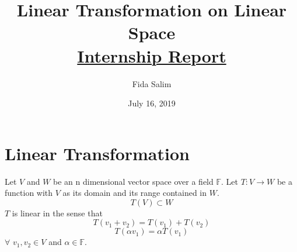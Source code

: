 \documentclass[12pt]{article}
\theoremstyle{definition}
\begin{document}
	\title{\textbf{Linear Transformation on Linear Space} \\
		\large\underline{Internship Report} 
	}
	\author{Fida Salim}
	\date{July 16, 2019}
	\maketitle
	\section{Linear Transformation}
	Let $ V $ and $W $ be an n dimensional vector space over a field $ \mathbb{F} $. Let $ T :V\rightarrow W $ be a function with $ V $ as its domain and its range contained in $ W $. $$ T(V)\subset W $$$ T $ is linear in the sense that $$ T(v_1 + v_2) = T(v_1)+T(v_2) $$ $$ T(\alpha v_1)=\alpha T(v_1)$$ 
	$\forall$ $ v_1,v_2 \in V$ and $\alpha\in\mathbb{F}$.\\
	
\end{document}
